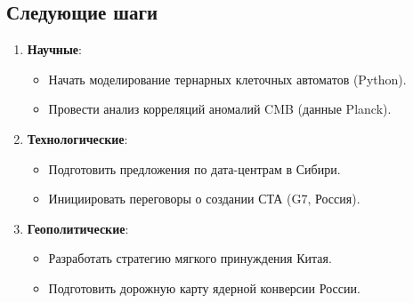 \documentclass[11pt, a4paper]{article}
\begin{document}
\subsection*{Следующие шаги}
\begin{enumerate}
    \item \textbf{Научные}:
    \begin{itemize}
        \item Начать моделирование тернарных клеточных автоматов (Python).
        \item Провести анализ корреляций аномалий CMB (данные Planck).
    \end{itemize}
    \item \textbf{Технологические}:
    \begin{itemize}
        \item Подготовить предложения по дата-центрам в Сибири.
        \item Инициировать переговоры о создании СТА (G7, Россия).
    \end{itemize}
    \item \textbf{Геополитические}:
    \begin{itemize}
        \item Разработать стратегию мягкого принуждения Китая.
        \item Подготовить дорожную карту ядерной конверсии России.
    \end{itemize}
\end{enumerate}
\end{document}
